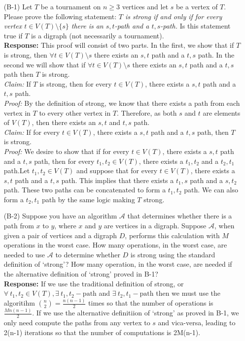 \documentclass{article}
\newcommand{\response}[1]{\leavevmode\\[0.05in]{\bf Response: } #1 \leavevmode\\[0.05in]}
\begin{document}
\begin{enumerate}
	\item[(B-1)] Let $T$ be a tournament on $n \geq 3$ vertices and let $s$ be a vertex of $T$.  Please prove the following statement: \emph{$T$ is strong if and only if for every vertex $t \in V(T) \setminus \{s\}$ there is an $s,t$-path and a $t,s$-path.}  Is this statement true if $T$ is a digraph (not necessarily a tournament).  
		\response{This proof will consist of two parts. In the first, we show that if $T$ is strong, then $\forall t \in V(T)\setminus s$ there exists an $s,t$ path and a $t,s$ path. In the second we will show that if $\forall t \in V(T)\setminus s$ there exists an $s,t$ path and a $t,s$ path then $T$ is strong.\\[1em]
		{\it Claim: } If $T$ is strong, then for every $t \in V(T)$, there exists a $s,t$ path and a $t,s$ path. \\[1em]
		{\it Proof: } By the definition of strong, we know that there exists a path from each vertex in $T$ to every other vertex in $T$. Therefore, as both $s$ and $t$ are elements of $V(T)$, then there exists an $s,t$ and $t,s$ path.\\[1em]
		{\it Claim: } If for every $t \in V(T)$, there exists a $s,t$ path and a $t,s$ path, then $T$ is strong.\\[1em]
		{\it Proof: } We desire to show that if for every $t \in V(T)$, there exists a $s,t$ path and a $t,s$ path, then for every $t_1,t_2 \in V(T)$, there exists a $t_1,t_2$ and a $t_2,t_1$ path.Let $t_1,t_2 \in V(T)$ and suppose that for every $t \in V(T)$, there exists a $s,t$ path and a $t,s$ path. This implies that there exists a $t_1,s$ path and a $s,t_2$ path. These two paths can be concatenated to form a $t_1,t_2$ path.  We can also form a $t_2,t_1$ path by the same logic making $T$ strong.}
	\item[(B-2)] Suppose you have an algorithm $\mathcal{A}$ that determines whether there is a path from $x$ to $y$, where $x$ and $y$ are vertices in a digraph.  Suppose $\mathcal{A}$, when given a pair of vertices and a digraph $D$, performs this calculation with $M$ operations in the worst case.  How many operations, in the worst case, are needed to use $\mathcal{A}$ to determine whether $D$ is strong using the standard definition of `strong'?  How many operation, in the worst case, are needed if the alternative definition of `strong' proved in B-1?
		\response{If we use the traditional definition of strong, or $\forall \ t_1, t_2 \in V(T), \exists \ t_1,t_2-\text{path}$ and $\exists \ t_2,t_1-\text{path}$ then we must use the algoritihm ${n \choose 2} = \frac{n(n-1)}{2}$ times so that the number of operations is $\frac{Mn(n-1)}{2}$. If we use the alternative definitiion of `strong' as proved in B-1, we only need compute the paths from any vertex to $s$ and vica-versa, leading to 2(n-1) iterations so that the number of computations is 2M(n-1).} 
\end{enumerate}
\end{document}
